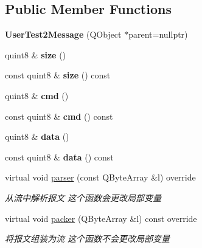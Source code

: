 \subsection*{Public Member Functions}
\begin{DoxyCompactItemize}
\item 
\mbox{\label{class_user_test2_message_aef607dfe4a27c0a3cefa010882662fca}} 
{\bfseries User\+Test2\+Message} (Q\+Object $\ast$parent=nullptr)
\item 
\mbox{\label{class_user_test2_message_a6bff29b86b9aa155f1e5e4458fd14373}} 
quint8 \& {\bfseries size} ()
\item 
\mbox{\label{class_user_test2_message_aaa43afbe85344eccbbb77fa83d21cea5}} 
const quint8 \& {\bfseries size} () const
\item 
\mbox{\label{class_user_test2_message_aeb546fe6d039ea82c44bd74ccc15a906}} 
quint8 \& {\bfseries cmd} ()
\item 
\mbox{\label{class_user_test2_message_a9327ae93b2bb9f7ad2c2fa7a5f60723d}} 
const quint8 \& {\bfseries cmd} () const
\item 
\mbox{\label{class_user_test2_message_a673e4150849c7d52886a64eb232f2c86}} 
quint8 \& {\bfseries data} ()
\item 
\mbox{\label{class_user_test2_message_ad6125b5ec45817c2abe704bf019255dd}} 
const quint8 \& {\bfseries data} () const
\item 
virtual void \mbox{\hyperlink{class_user_test2_message_ad7a4a9e020c0ede85bee7d5e9d2c91ba}{parser}} (const Q\+Byte\+Array \&l) override
\begin{DoxyCompactList}\small\item\em 从流中解析报文 这个函数会更改局部变量 \end{DoxyCompactList}\item 
virtual void \mbox{\hyperlink{class_user_test2_message_a7dedda7f8f5f49ca24fac391ba4d02d2}{packer}} (Q\+Byte\+Array \&l) const override
\begin{DoxyCompactList}\small\item\em 将报文组装为流 这个函数不会更改局部变量 \end{DoxyCompactList}\end{DoxyCompactItemize}


